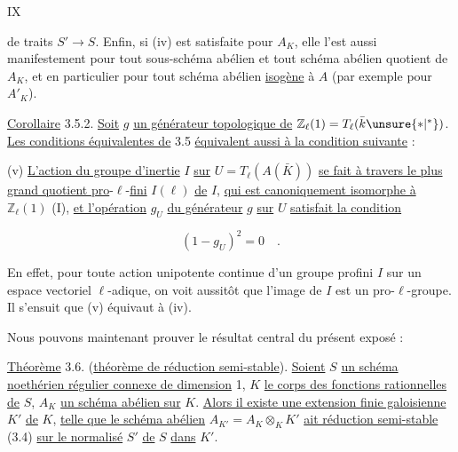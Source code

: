 \hfill IX

de traits $S'\longrightarrow S$. Enfin, si (iv) est satisfaite pour $A_K$, elle l'est aussi manifestement pour tout sous-schéma abélien et tout schéma abélien quotient de $A_K$, et en particulier pour tout schéma abélien \uline{isogène} à $A$ (par exemple pour $A'_K$).

\uline{Corollaire} 3.5.2. \uline{Soit} $g$ \uline{un générateur topologique de} $\mathbb Z_\ell(1)=T_\ell(\bar k\unsure{\mathord{\ast}|{}^{*}})$. \uline{Les conditions équivalentes de} 3.5 \uline{équivalent aussi à la condition suivante} :

(v) \uline{L'action du groupe d'inertie} $I$ \uline{sur} $U=T_\ell(A(\bar K))$ \uline{se fait à travers le plus grand quotient pro}-$\ell$-\uline{fini} $I(\ell)$ \uline{de} $I$, \uline{qui est canoniquement isomorphe à} $\mathbb Z_\ell(1)$ (I\hspace{2.5em}), \uline{et l'opération} $g_U$ \uline{du générateur} $g$ \uline{sur} $U$ \uline{satisfait la condition}

\[
(1-g_U)^2=0\quad.\tag*{(3.5.3)}
\]

En effet, pour toute action unipotente continue d'un groupe profini $I$ sur un espace vectoriel $\ell$-adique, on voit aussitôt que l'image de $I$ est un pro-$\ell$-groupe. Il s'ensuit que (v) équivaut à (iv).

Nous pouvons maintenant prouver le résultat central du présent exposé :

\uline{Théorème} 3.6. (\uline{théorème de réduction semi-stable}). \uline{Soient} $S$ \uline{un schéma noethérien régulier connexe de dimension} 1, $K$ \uline{le corps des fonctions rationnelles de} $S$, $A_K$ \uline{un schéma abélien sur} $K$. \uline{Alors il existe une extension finie galoisienne} $K'$ \uline{de} $K$, \uline{telle que le schéma abélien} $A_{K'}=A_K\otimes_K K'$ \uline{ait réduction semi-stable} (3.4) \uline{sur le normalisé} $S'$ \uline{de} $S$ \uline{dans} $K'$.

